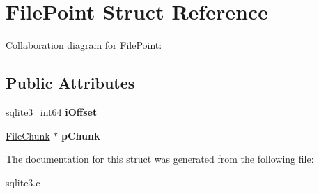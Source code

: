 \hypertarget{structFilePoint}{}\section{File\+Point Struct Reference}
\label{structFilePoint}


Collaboration diagram for File\+Point\+:
\subsection*{Public Attributes}
\begin{DoxyCompactItemize}
\item 
sqlite3\+\_\+int64 {\bfseries i\+Offset}\hypertarget{structFilePoint_a00a345e479cd37ebeb9e6ed475eb4112}{}\label{structFilePoint_a00a345e479cd37ebeb9e6ed475eb4112}

\item 
\hyperlink{structFileChunk}{File\+Chunk} $\ast$ {\bfseries p\+Chunk}\hypertarget{structFilePoint_aa17216d9d2559f14a00a2c72a8959298}{}\label{structFilePoint_aa17216d9d2559f14a00a2c72a8959298}

\end{DoxyCompactItemize}


The documentation for this struct was generated from the following file\+:\begin{DoxyCompactItemize}
\item 
sqlite3.\+c\end{DoxyCompactItemize}
